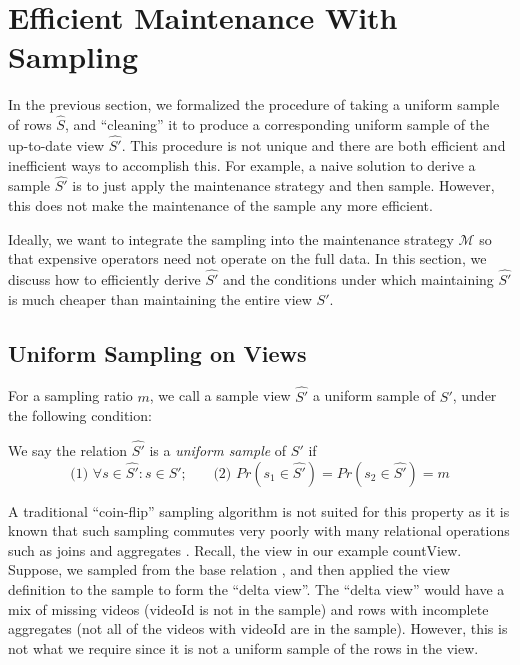\section{Efficient Maintenance With Sampling} \label{sampling}
In the previous section, we formalized the procedure of taking a uniform sample of rows $\hat{S}$, and ``cleaning'' it to produce a corresponding uniform sample of the up-to-date view $\hat{S'}$.
This procedure is not unique and there are both efficient and inefficient ways to accomplish this. 
For example, a naive solution to derive a sample $\hat{S'}$ is to just apply the maintenance strategy and then sample.
However, this does not make the maintenance of the sample any more efficient.

Ideally, we want to integrate the sampling into the maintenance strategy $\mathcal{M}$ so that expensive operators
need not operate on the full data.
In this section, we discuss how to efficiently derive $\hat{S'}$ and the conditions under which
maintaining $\hat{S'}$ is much cheaper than maintaining the entire view $S'$.

\subsection{Uniform Sampling on Views}
For a sampling ratio $m$, we call a sample view $\hat{S'}$ a uniform sample of $S'$, under the following condition:
\begin{definition} We say the relation $\hat{S'}$ is a \emph{uniform sample} of $S'$ if
\[\text{(1) } \forall s \in \hat{S'} : s \in S'\text{;~~~~~ (2) }Pr(s_1 \in \hat{S'}) =  Pr(s_2 \in \hat{S'}) = m\]
\end{definition}
A traditional ``coin-flip'' sampling algorithm is not suited for this property as it is known that such sampling commutes very poorly with many relational operations such as joins and aggregates \cite{chaudhuri1999random}.
Recall, the view in our example \textsf{countView}. 
Suppose, we sampled from the base relation , and then applied the view definition to the sample to form the ``delta view''.
The ``delta view'' would have a mix of missing videos (\textsf{videoId} is not in the sample) and rows with incomplete aggregates (not all of the videos with \textsf{videoId} are in the sample).
However, this is not what we require since it is not a uniform sample of the rows in the view. 

